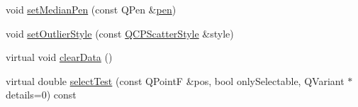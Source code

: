 \begin{DoxyCompactItemize}
\item 
void \hyperlink{class_q_c_p_statistical_box_a7260ac55b669f5d0a74f16d5ca84c52c}{set\-Median\-Pen} (const Q\-Pen \&\hyperlink{class_q_c_p_abstract_plottable_a41d060007cc6b3037c9c04d22d0c0398}{pen})
\item 
void \hyperlink{class_q_c_p_statistical_box_ad5241943422eb8e58360a97e99ad6aa7}{set\-Outlier\-Style} (const \hyperlink{class_q_c_p_scatter_style}{Q\-C\-P\-Scatter\-Style} \&style)
\item 
virtual void \hyperlink{class_q_c_p_statistical_box_a19112994449df0c20287858436cc68e3}{clear\-Data} ()
\item 
virtual double \hyperlink{class_q_c_p_statistical_box_a7d3ac843dc48a085740fdfc4319a89cc}{select\-Test} (const Q\-Point\-F \&pos, bool only\-Selectable, Q\-Variant $\ast$details=0) const 
\end{DoxyCompactItemize}
